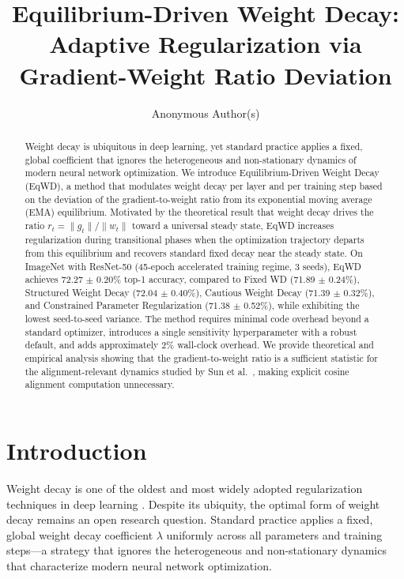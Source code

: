 \documentclass{article}
\title{Equilibrium-Driven Weight Decay: Adaptive Regularization via Gradient-Weight Ratio Deviation}
\author{%
  Anonymous Author(s)
}
\begin{document}
\maketitle

\begin{abstract}
Weight decay is ubiquitous in deep learning, yet standard practice
applies a fixed, global coefficient that ignores the heterogeneous and
non-stationary dynamics of modern neural network optimization. We
introduce Equilibrium-Driven Weight Decay (EqWD), a method that
modulates weight decay per layer and per training step based on the
deviation of the gradient-to-weight ratio from its exponential moving
average (EMA) equilibrium. Motivated by the theoretical result that
weight decay drives the ratio $r_t = \|g_t\| / \|w_t\|$ toward a
universal steady state, EqWD increases regularization during
transitional phases when the optimization trajectory departs from this
equilibrium and recovers standard fixed decay near the steady state. On
ImageNet with ResNet-50 (45-epoch accelerated training regime, 3 seeds),
EqWD achieves 72.27 $\pm$ 0.20\% top-1 accuracy, compared to Fixed WD
(71.89 $\pm$ 0.24\%), Structured Weight Decay (72.04 $\pm$ 0.40\%),
Cautious Weight Decay (71.39 $\pm$ 0.32\%), and Constrained Parameter
Regularization (71.38 $\pm$ 0.52\%), while exhibiting the lowest
seed-to-seed variance. The method requires minimal code overhead beyond
a standard optimizer, introduces a single sensitivity hyperparameter
with a robust default, and adds approximately 2\% wall-clock overhead.
We provide theoretical and empirical analysis showing that the
gradient-to-weight ratio is a sufficient statistic for the
alignment-relevant dynamics studied by Sun et al.~\citep{sun2025cvpr},
making explicit cosine alignment computation unnecessary.
\end{abstract}

\section{Introduction}
\label{sec:intro}

Weight decay is one of the oldest and most widely adopted regularization
techniques in deep learning \citep{krogh1991simple, hanson1988comparing}.
Despite its ubiquity, the optimal form of weight decay remains an open
research question. Standard practice applies a fixed, global weight
decay coefficient $\lambda$ uniformly across all parameters and
training steps---a strategy that ignores the heterogeneous and
non-stationary dynamics that characterize modern neural network
optimization.
\end{document}
